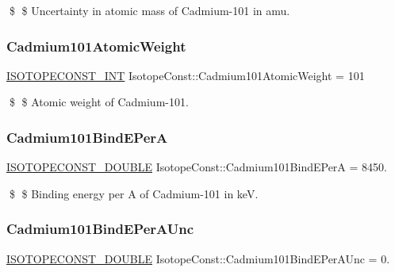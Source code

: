 \$ \$ Uncertainty in atomic mass of Cadmium-\/101 in amu. \mbox{\label{group___isotope_const-_cadmium-_cd101_ga14f9fbf3a4cd71b32114c00f7f306bbc}} 
\subsubsection{\texorpdfstring{Cadmium101\+Atomic\+Weight}{Cadmium101AtomicWeight}}
{\footnotesize\ttfamily \mbox{\hyperlink{group___isotope_const-_macros_ga5f18360b3e99483a35c32d789e62621c}{I\+S\+O\+T\+O\+P\+E\+C\+O\+N\+S\+T\+\_\+\+I\+NT}} Isotope\+Const\+::\+Cadmium101\+Atomic\+Weight = 101}

\$ \$ Atomic weight of Cadmium-\/101. \mbox{\label{group___isotope_const-_cadmium-_cd101_gabccf8c9ec972be872a9fd8fc189f8ea3}} 
\subsubsection{\texorpdfstring{Cadmium101\+Bind\+E\+PerA}{Cadmium101BindEPerA}}
{\footnotesize\ttfamily \mbox{\hyperlink{group___isotope_const-_macros_ga8f45a7272ce02c0b4c65c44636ed719a}{I\+S\+O\+T\+O\+P\+E\+C\+O\+N\+S\+T\+\_\+\+D\+O\+U\+B\+LE}} Isotope\+Const\+::\+Cadmium101\+Bind\+E\+PerA = 8450.}

\$ \$ Binding energy per A of Cadmium-\/101 in keV. \mbox{\label{group___isotope_const-_cadmium-_cd101_ga8a18c46700f6a1ea6d71e25d78ab8c62}} 
\subsubsection{\texorpdfstring{Cadmium101\+Bind\+E\+Per\+A\+Unc}{Cadmium101BindEPerAUnc}}
{\footnotesize\ttfamily \mbox{\hyperlink{group___isotope_const-_macros_ga8f45a7272ce02c0b4c65c44636ed719a}{I\+S\+O\+T\+O\+P\+E\+C\+O\+N\+S\+T\+\_\+\+D\+O\+U\+B\+LE}} Isotope\+Const\+::\+Cadmium101\+Bind\+E\+Per\+A\+Unc = 0.}

